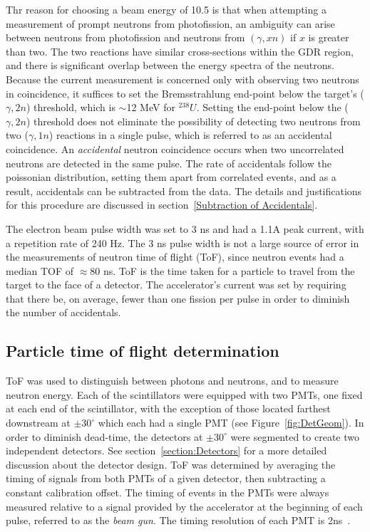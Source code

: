 Thr reason for choosing a beam energy of 10.5 is that when attempting a measurement of prompt neutrons from photofission, an ambiguity can arise between neutrons from photofission and neutrons from $(\gamma, xn)$ if $x$ is greater than two.
The two reactions have similar cross-sections within the GDR region, and there is significant overlap between the energy spectra of the neutrons.
Because the current measurement is concerned only with observing two neutrons in coincidence, it suffices to set the Bremsstrahlung end-point below the target's ($\gamma, 2n$) threshold, which is $\sim$12 MeV for $^{238}U$.
Setting the end-point below the ($\gamma, 2n$) threshold does not eliminate the possibility of detecting two neutrons from  two ($\gamma, 1n$) reactions in a single pulse, which is referred to as an accidental coincidence.
An \textit{accidental} neutron coincidence occurs when two uncorrelated neutrons are detected in the same pulse.
The rate of accidentals follow the poissonian distribution, setting them apart from correlated events, and as a result, accidentals can be subtracted from the data.
The details and justifications for this procedure are discussed in section~\ref{Subtraction of Accidentals}.

The electron beam pulse width was set to 3 ns and had a 1.1A peak current, with a repetition rate of 240 Hz.
The 3 ns pulse width is not a large source of error in the measurements of neutron time of flight (ToF), since neutron events had a median TOF of $\approx$80 ns.
ToF is the time taken for a particle to travel from the target to the face of a detector.
The accelerator's current was set by requiring that there be, on average, fewer than one fission per pulse in order to diminish the number of accidentals.

\subsection{Particle time of flight determination}
\label{reconstruction}
ToF was used to distinguish between photons and neutrons, and to measure neutron energy.
Each of the scintillators were equipped with two PMTs, one fixed at each end of the scintillator, with the exception of those located farthest downstream at $\pm30^{\circ}$ which each had a single PMT (see Figure~\ref{fig:DetGeom}).
In order to diminish dead-time, the detectors at $\pm30^{\circ}$ were segmented to create two independent detectors.
See section~\ref{section:Detectors} for a more detailed discussion about the detector design.
ToF was determined by averaging the timing of signals from both PMTs of a given detector, then subtracting a constant calibration offset.
The timing of events in the PMTs were always measured relative to a signal provided by the accelerator at the beginning of each pulse, referred to as the \textit{beam gun}.
The timing resolution of each PMT is 2ns~\cite{PMT}.

